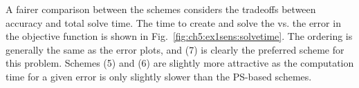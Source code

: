 A fairer comparison between the schemes considers the tradeoffs between accuracy and total solve time.
The time to create and solve the \qp{} vs. the error in the objective function is shown in Fig.~\ref{fig:ch5:ex1sens:solvetime}.
The ordering is generally the same as the error plots, and (7) is clearly the preferred scheme for this problem.
Schemes (5) and (6) are slightly more attractive as the computation time for a given error is only slightly slower than the PS-based schemes.